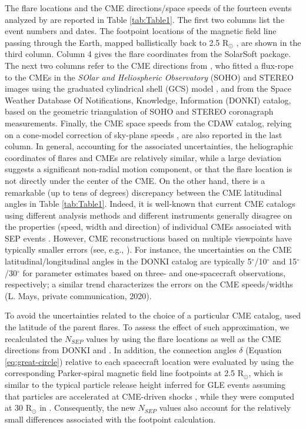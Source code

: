\documentclass{aastex61}
\begin{document}
The flare locations and the CME directions/space speeds of the fourteen events analyzed by \citet{ref:DENOLFO2019} are reported in Table \ref{tab:Table1}. 
The first two columns list the event numbers and dates.
The footpoint locations of the magnetic field line passing through the Earth, mapped ballistically back to 2.5 R$_{\odot}$ \citep{ref:BRUNORICHARDSON2021}, are shown in the third column.
Column 4 gives the flare coordinates from the SolarSoft package. The next two columns refer to the CME directions from \citet{ref:GOPALSWAMY2014}, who fitted a flux-rope to the CMEs in the \textit{SOlar and Heliospheric Observatory} (SOHO) and STEREO images using the graduated cylindrical shell (GCS) model \citep{ref:THERNISIEN2011}, and from the Space Weather Database Of Notifications, Knowledge, Information (DONKI) catalog, based
on the geometric triangulation of SOHO and STEREO coronagraph measurements.
Finally, the CME space speeds from the CDAW catalog,
relying on a cone-model correction of sky-plane speeds \citep{ref:GOPALSWAMY2010}, are also reported in the last column.
In general, accounting for the associated uncertainties, the heliographic coordinates of flares and CMEs are relatively similar, while a large deviation suggests a significant non-radial motion component, or that the flare location is not directly under the center of the CME.
On the other hand, there is a remarkable (up to tens of degrees) discrepancy between the CME latitudinal angles in Table \ref{tab:Table1}.
Indeed, it is well-known that current CME catalogs using different analysis methods and different instruments generally disagree on the properties (speed, width and direction) of individual CMEs associated with SEP events \citep{ref:RICHARDSON2015}. However, CME reconstructions based on multiple viewpoints have typically smaller errors (see, e.g., \citealp{ref:VERBEKE2022}). For instance, the uncertainties on the CME latitudinal/longitudinal angles in the DONKI catalog are typically 5$^{\circ}$/10$^{\circ}$ and 15$^{\circ}$/30$^{\circ}$ for parameter estimates based on three- and one-spacecraft observations, respectively; a similar trend characterizes the errors on the CME speeds/widths (L. Mays, private communication, 2020). 


To avoid the uncertainties related to the choice of a particular CME catalog, \citet{ref:DENOLFO2019} used the latitude of the parent flares. To assess the effect of such approximation, we recalculated the $N_{SEP}$ values by using the flare locations as well as the CME directions from DONKI and \citet{ref:GOPALSWAMY2014}. 
In addition, the connection angles $\delta$ (Equation \ref{eq:great-circle}) relative to each spacecraft location were evaluated by using the corresponding Parker-spiral magnetic field line footpoints at 2.5 R$_{\odot}$, which is similar to the typical particle release height inferred for GLE events assuming that particles are accelerated at CME-driven shocks \citep{ref:REAMES2009,ref:GOPALSWAMY2013}, while they were computed at 30 R$_{\odot}$ in \citet{ref:DENOLFO2019}. Consequently, the new $N_{SEP}$ values also account for the relatively small differences associated with the footpoint calculation.
\end{document}

